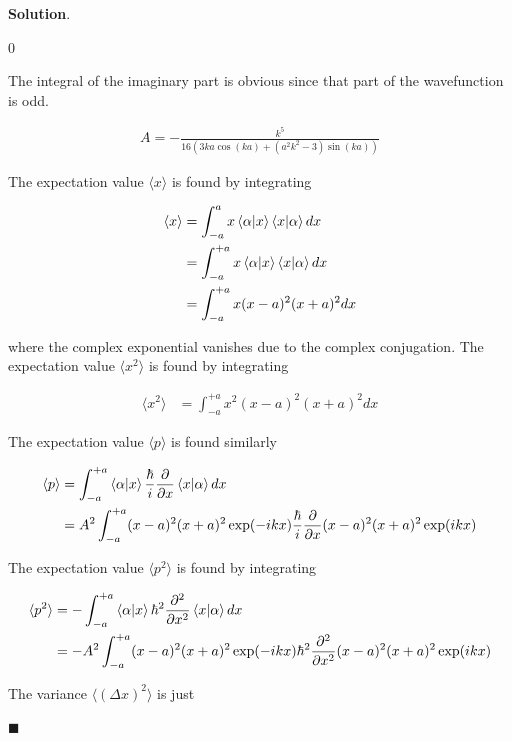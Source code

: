\documentclass[12pt]{article}
\theoremstyle{definition}
\newenvironment{s}{%
        \begin{trivlist} \item \textbf{Solution}. }{%
            \hspace*{\fill} $\blacksquare$\end{trivlist}}%
\begin{document}
{\begin{s}
\begin{doublespace}
\noindent\(0\)
\end{doublespace}

The integral of the imaginary part is obvious since that part of the wavefunction is odd.

\begin{align*}
A = -\frac{k^5}{16 \left(3ka\cos(ka)+\left(a^2 k^2-3\right) \sin(ka)\right)}
\end{align*}

The expectation value $\langle x\rangle$ is found by integrating

\begin{align*}
\langle x \rangle &= \int_{-a}^{a} x\bra{\alpha}\ket{x}\bra{x}\ket{\alpha}dx \\
&= \int_{-a}^{+a} x\bra{\alpha}\ket{x}\bra{x}\ket{\alpha}dx \\
&= \int_{-a}^{+a} x (x-a)^{2}(x+a)^{2}dx
\end{align*}

where the complex exponential vanishes due to the complex conjugation. The expectation value $\langle x^{2}\rangle$ is found by integrating

\begin{align*}
\langle x^{2} \rangle &= \int_{-a}^{+a} x^{2} (x-a)^{2}(x+a)^{2}dx
\end{align*}

The expectation value $\langle p\rangle$ is found similarly

\begin{align*}
\langle p \rangle &= \int_{-a}^{+a} \bra{\alpha}\ket{x}\frac{\hbar}{i}\frac{\partial}{\partial x}\bra{x}\ket{\alpha}dx\\
&= A^{2} \int_{-a}^{+a}(x-a)^{2}(x+a)^{2}\exp(-ikx)\frac{\hbar}{i}\frac{\partial}{\partial x}(x-a)^{2}(x+a)^{2}\exp(ikx)
\end{align*}

The expectation value $\langle p^{2}\rangle$ is found by integrating

\begin{align*}
\langle p^{2} \rangle &= -\int_{-a}^{+a} \bra{\alpha}\ket{x}\hbar^{2}\frac{\partial^{2}}{\partial x^{2}}\bra{x}\ket{\alpha}dx\\
&= -A^{2}\int_{-a}^{+a}(x-a)^{2}(x+a)^{2}\exp(-ikx)\hbar^{2}\frac{\partial^{2}}{\partial x^{2}}(x-a)^{2}(x+a)^{2}\exp(ikx)
\end{align*}

The variance $\langle (\Delta x)^{2}\rangle$ is just



\end{s}}
\end{document}
